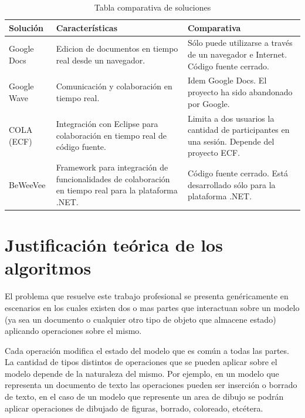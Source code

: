 \documentclass[12pt,a4paper]{article}
\begin{document}
\begin{table}[ht]
    \begin{tabular}{ | p{2.5cm} | p{5cm} | p{5cm} | }
    \hline
    Solución & Características & Comparativa \\ \hline

    Google Docs & Edicion de documentos en tiempo real desde un navegador. &
    Sólo puede utilizarse a través de un navegador e Internet. Código fuente cerrado. \\ \hline

    Google Wave & Comunicación y colaboración en tiempo real. &
    Idem Google Docs. El proyecto ha sido abandonado por Google. \\ \hline

    COLA (ECF) & Integración con Eclipse para colaboración en tiempo real de código fuente. &
	Limita a dos usuarios la cantidad de participantes en una sesión. Depende del proyecto ECF. \\ \hline

    BeWeeVee & Framework para integración de funcionalidades de colaboración en tiempo real para
    la plataforma .NET. & Código fuente cerrado. Está desarrollado sólo para la plataforma .NET. \\ \hline

    \end{tabular}
    \caption{\label{soluciones_comparacion} Tabla comparativa de soluciones}
\end{table}

	\section{Justificación teórica de los algoritmos}
	
	El problema que resuelve este trabajo profesional se presenta genéricamente en escenarios en los cuales 
	existen dos o mas partes que interactuan sobre un modelo (ya sea un documento o cualquier otro tipo de 
	objeto que almacene estado) aplicando operaciones sobre el mismo.
	
	Cada operación modifica el estado del modelo que es común a todas las partes. La cantidad de tipos distintos
	de operaciones que se pueden aplicar sobre el modelo depende de la naturaleza del mismo. Por ejemplo, en un
	modelo que representa un documento de texto las operaciones pueden ser inserción o borrado de texto, en el caso
	de un modelo que represente un area de dibujo se podrán aplicar operaciones de dibujado de figuras, 
	borrado, coloreado, etcétera.
	
\end{document}
